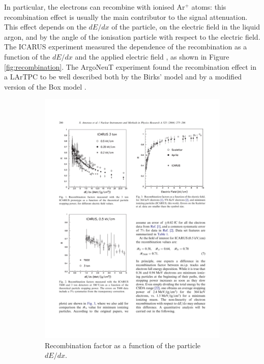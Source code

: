 In particular, the electrons can recombine with ionised Ar$^+$ atoms: this recombination effect is usually the main contributor to the signal attenuation. This effect depends on the $dE/dx$ of the particle, on the electric field in the liquid argon, and by the angle of the ionisation particle with respect to the electric field. The ICARUS experiment measured the dependence of the recombination as a function of the $dE/dx$ and the applied electric field \cite{Amoruso:2004dy}, as shown in Figure \ref{fig:recombination}. The ArgoNeuT experiment found the recombination effect in a LArTPC to be well described both by the Birks' model \cite{Birks:1951boa} and by a modified version of the Box model \cite{Thomas:1987zz}. 

\begin{figure}[htbp]
\centering
  \begin{subfigure}{0.48\textwidth}
    \includegraphics[height=0.9\linewidth]{figures/icarus1.pdf}
    \caption{Recombination factor as a function of the particle $dE/dx$.}
  \end{subfigure}\hfill
  \begin{subfigure}{0.48\textwidth}
    \begin{center}

\end{center}
\end{subfigure}
\end{figure}
